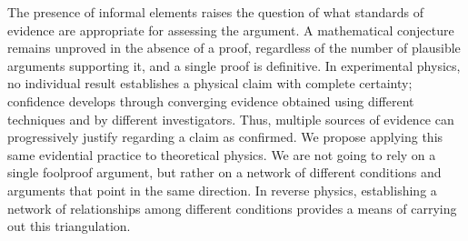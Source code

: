 \documentclass[entropy,article,submit,moreauthors]{Definitions/mdpi}
\begin{document}
The presence of informal elements raises the question of what standards of evidence are appropriate for assessing the argument. A mathematical conjecture remains unproved in the absence of a proof, regardless of the number of plausible arguments supporting it, and a single proof is definitive. In experimental physics, no individual result establishes a physical claim with complete certainty; confidence develops through converging evidence obtained using different techniques and by different investigators. Thus, multiple sources of evidence can progressively justify regarding a claim as confirmed. We propose applying this same evidential practice to theoretical physics. We are not going to rely on a single foolproof argument, but rather on a network of different conditions and arguments that point in the same direction. In reverse physics, establishing a network of relationships among different conditions provides a means of carrying out this triangulation.

\end{document}
